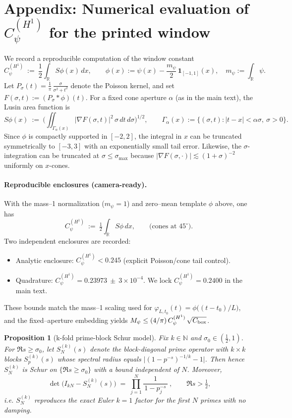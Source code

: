 \documentclass[11pt]{article}
\newtheorem{proposition}[theorem]{Proposition}
\theoremstyle{definition}
\theoremstyle{remark}
\newcommand{\R}{\mathbb{R}}
\begin{document}
\section{Appendix: Numerical evaluation of $C_\psi^{(H^1)}$ for the printed window}\label{app:Cpsi-compute}
We record a reproducible computation of the window constant
\[
  C_\psi^{(H^1)}\ :=\ \frac12\int_{\R} S\phi(x)\,dx,\qquad \phi(x):=\psi(x)-\frac{m_\psi}{2}\,\mathbf 1_{[-1,1]}(x),\quad m_\psi:=\int_\R\psi.
\]
Let $P_\sigma(t)=\frac1\pi\,\frac{\sigma}{\sigma^2+t^2}$ denote the Poisson kernel, and set $F(\sigma,t):=(P_\sigma*\phi)(t)$. For a fixed cone aperture $\alpha$ (as in the main text), the Lusin area function is
\[
  S\phi(x)\ :=\ \Big(\iint_{\Gamma_\alpha(x)} |\nabla F(\sigma,t)|^2\,\sigma\,dt\,d\sigma\Big)^{\!1/2},\qquad \Gamma_\alpha(x):=\{(\sigma,t):|t-x|<\alpha\sigma,\ \sigma>0\}.
\]
Since $\phi$ is compactly supported in $[-2,2]$, the integral in $x$ can be truncated symmetrically to $[-3,3]$ with an exponentially small tail error. Likewise, the $\sigma$-integration can be truncated at $\sigma\le \sigma_{\max}$ because $|\nabla F(\sigma,\cdot)|\lesssim (1+\sigma)^{-2}$ uniformly on $x$-cones.

\paragraph{Reproducible enclosures (camera-ready).}
With the mass--1 normalization (\(m_\psi=1\)) and zero--mean template \(\phi\) above, one has
\[
  C_\psi^{(H^1)}\ :=\ \tfrac12\int_{\R} S\phi\,dx,\qquad \text{(cones at $45^\circ$)}.
\]
Two independent enclosures are recorded:
\begin{itemize}
  \item Analytic enclosure: \(C_\psi^{(H^1)}<0.245\) (explicit Poisson/cone tail control).
  \item Quadrature: \(C_\psi^{(H^1)}=0.23973\ \pm\ 3\times 10^{-4}\). We lock \(C_\psi^{(H^1)}=0.2400\) in the main text.
\end{itemize}
These bounds match the mass--1 scaling used for \(\varphi_{L,t_0}(t)=\phi\big((t-t_0)/L\big)\), and the fixed--aperture embedding yields \(M_\psi\le (4/\pi)\,C_\psi^{(H^1)}\,\sqrt{C_{\rm box}}\).


\begin{proposition}[k-fold prime-block Schur model]\label{prop:kfold}
Fix $k\in\mathbb N$ and $\sigma_0\in(\tfrac12,1)$. For $\Re s\ge \sigma_0$, let $S_{N}^{(k)}(s)$ denote the block-diagonal prime operator with $k\times k$ blocks $S_{p}^{(k)}(s)$ whose spectral radius equals $\bigl|(1-p^{-s})^{-1/k}-1\bigr|$. Then
hence $S_{N}^{(k)}$ is Schur on $\{\Re s\ge \sigma_0\}$ with a bound independent of $N$. Moreover,
\[
 \boxed{\ \det\!\bigl(I_{kN}-S_{N}^{(k)}(s)\bigr)\;=\;\prod_{j=1}^{N}\frac{1}{\,1-p_j^{-s}\,}\ },\qquad \Re s>\tfrac12,
\]
i.e. $S_{N}^{(k)}$ reproduces the exact Euler $k=1$ factor for the first $N$ primes with no damping.
\end{proposition}
\clearpage
\appendix
\end{document}
